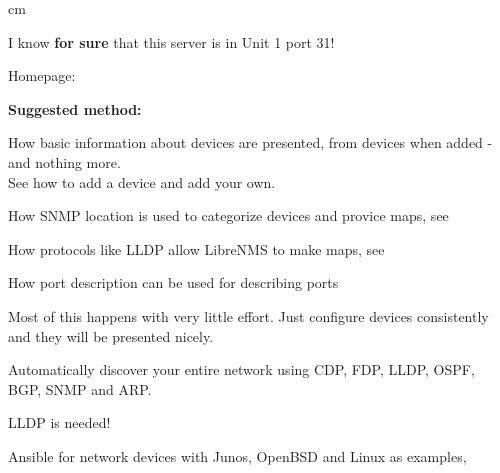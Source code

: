 \documentclass[Screen16to9,17pt]{foils}
\begin{document}
 cm
\centerline{I know {\bf for sure} that this server is in Unit 1 port 31!}




\begin{list2}
\item Homepage: 
\item {\bf Suggested method:}
\item How basic information about devices are presented, from devices when added - and nothing more.\\
See how to add a device and add your own. 
\item How SNMP location is used to categorize devices and provice maps, see\\
\item How protocols like LLDP allow LibreNMS to make maps, see\\
\item How port description can be used for describing ports\\
\end{list2}

Most of this happens with very little effort. Just configure devices consistently and they will be presented nicely.





Automatically discover your entire network using CDP, FDP, LLDP,
OSPF, BGP, SNMP and ARP.



\centerline{LLDP is needed!}




Ansible for network devices with Junos, OpenBSD and Linux as examples,
\end{document}
